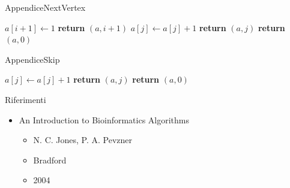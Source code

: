 	\begin{frame}{Appendice}{NextVertex}
		\begin{center}
			\begin{minipage}{5.8cm}
				\begin{algorithmic}[1]
						\State $a[i+1] \gets 1$
						\State \textbf{return} $(a, i+1)$
					\Else
								\State $a[j] \gets a[j] + 1$
								\State \textbf{return} $(a, j)$
							\EndIf
						\EndFor
					\EndIf
					\State \textbf{return} $(a, 0)$				
					\EndProcedure
				\end{algorithmic}
			\end{minipage}
		\end{center}	
	\end{frame}	

	\begin{frame}{Appendice}{Skip}
		\begin{center}
			\begin{minipage}{4.8cm}
				\begin{algorithmic}[1]
								\State $a[j] \gets a[j] + 1$
								\State \textbf{return} $(a,j)$
							\EndIf
						\EndFor										
						\State \textbf{return} $(a, 0)$				
					\EndProcedure
				\end{algorithmic}
			\end{minipage}
		\end{center}	
	\end{frame}
	
	\begin{frame}{Riferimenti}
		\begin{itemize}
			\item An Introduction to Bioinformatics Algorithms
			\begin{itemize}
				\item N. C. Jones, P. A. Pevzner
				\item Bradford
				\item 2004
			\end{itemize}
		\end{itemize}
	\end{frame}


